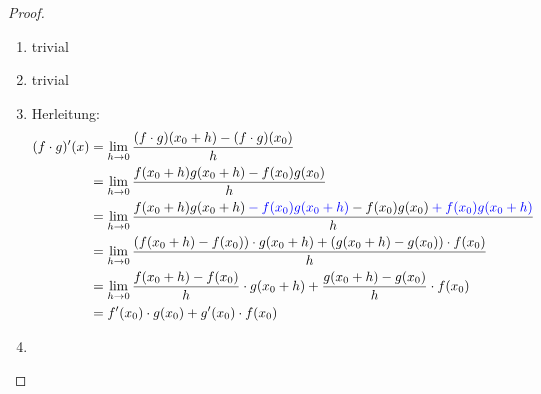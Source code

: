 \begin{proof}
  \begin{enumerate}
    \item trivial
    \item trivial
    \item Herleitung:
      \begin{align*}
        (f\cdot g)'(x) &= \lim_{h \rightarrow 0}\frac{(f \cdot g)(x_0+h)-(f \cdot g)(x_0)}{h}\\
        &= \lim_{h \rightarrow 0}\frac{f(x_0+h) g(x_0+h) - f(x_0)  g(x_0)} h \\
        &= \lim_{h \rightarrow 0}\frac{f(x_0+h) g(x_0+h) \color{blue}- f(x_0) g(x_0+h)\color{black} - f(x_0)  g(x_0) \color{blue}+ f(x_0)  g(x_0+h)\color{black}} h\\
        &= \lim_{h \rightarrow 0}\frac{(f(x_0+h) - f(x_0))\cdot g(x_0+h) + (g(x_0+h) - g(x_0)) \cdot f(x_0) } h\\
        &= \lim_{h \rightarrow 0}\frac{f(x_0+h) - f(x_0)} h \cdot g(x_0+h) + \frac{g(x_0+h) - g(x_0)} h \cdot f(x_0)\\
        &= f'(x_0) \cdot g(x_0) + g'(x_0) \cdot f(x_0)
      \end{align*}
    \item {}
  \end{enumerate}
\end{proof}

